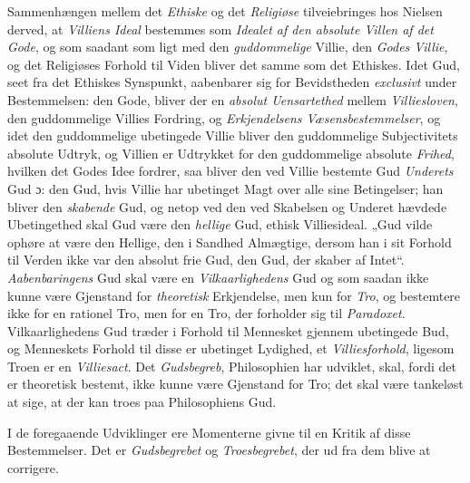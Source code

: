 \documentclass[12pt,a4paper]{book}
\newcommand{\opage}[1]{\marginnote{\footnotesize\textit{[#1]}}}
\begin{document}
Sammenhængen mellem det \emph{Ethiske} og det \emph{Religiøse} tilveiebringes hos Nielsen derved, at
\emph{Villiens Ideal} bestemmes som \emph{Idealet af den absolute Villen af det Gode}, og som saadant som ligt med den \emph{guddommelige} Villie, den \emph{Godes Villie}, og det Religiøses Forhold til
Viden bliver det samme som det Ethiskes. Idet Gud, seet fra det Ethiskes Synspunkt,
aabenbarer sig for Bevidstheden \emph{exclusivt} under Bestemmelsen: den Gode, bliver der en
\emph{absolut Uensartethed} mellem \emph{Villiesloven}, den guddommelige Villies Fordring, og \emph{Erkjendelsens Væsensbestemmelser}, og idet den guddommelige ubetingede Villie bliver den
guddommelige Subjectivitets absolute Udtryk, og Villien er Udtrykket for den guddommelige
absolute \emph{Frihed}, hvilken det Godes Idee fordrer, saa bliver den ved Villie bestemte Gud
\emph{Underets} Gud ɔ: den Gud, hvis Villie har ubetinget Magt over alle sine Betingelser;
han bliver den \emph{skabende} Gud, og netop ved den ved Skabelsen og Underet hævdede
Ubetingethed skal Gud være den \emph{hellige} Gud, ethisk Villiesideal. „Gud vilde ophøre at
være den Hellige, den i Sandhed Almægtige, dersom han i sit Forhold til Verden ikke var den
absolut frie Gud, den Gud, der skaber af Intet“. \emph{Aabenbaringens} Gud skal være en
\emph{Vilkaarlighedens} Gud og som saadan ikke kunne være Gjenstand for \emph{theoretisk} Erkjendelse, men kun for \emph{Tro}, og bestemtere ikke for en rationel Tro, men for en Tro, der
forholder sig til \emph{Paradoxet}. Vilkaarlighedens Gud træder i Forhold til Mennesket gjennem
ubetingede \opage{165}Bud, og Menneskets Forhold til disse er ubetinget Lydighed, et
\emph{Villiesforhold}, ligesom Troen er en \emph{Villiesact}. Det \emph{Gudsbegreb}, Philosophien
har udviklet, skal, fordi det er theoretisk bestemt, ikke kunne være Gjenstand for Tro; det
skal være tankeløst at sige, at der kan troes paa Philosophiens Gud.

I de foregaaende Udviklinger ere Momenterne givne til en Kritik af disse Bestemmelser. Det
er \emph{Gudsbegrebet} og \emph{Troesbegrebet}, der ud fra dem blive at corrigere.
\end{document}
